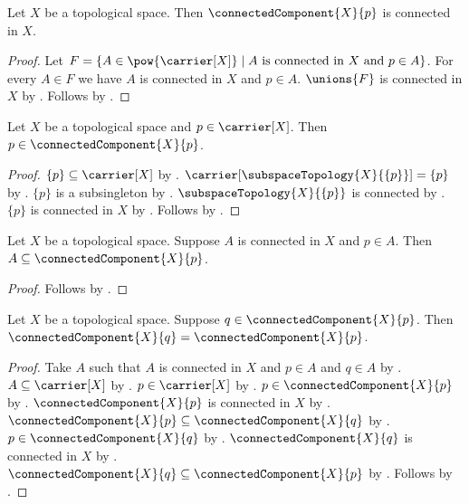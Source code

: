 \begin{theorem}\label{connected_component_is_connected}
    Let $X$ be a topological space.
    Then $\connectedComponent{X}{p}$ is connected in $X$.
\end{theorem}
\begin{proof}
    Let $F=\{A\in\pow{\carrier[X]}\mid\text{$A$ is connected in $X$ and $p\in A$}\}$.
    For every $A\in F$ we have $A$ is connected in $X$ and $p\in A$.
    $\unions{F}$ is connected in $X$ by .
    Follows by .
\end{proof}

\begin{theorem}\label{point_in_connected_component}
    Let $X$ be a topological space and $p\in\carrier[X]$.
    Then $p\in\connectedComponent{X}{p}$.
\end{theorem}
\begin{proof}
    $\{p\}\subseteq\carrier[X]$ by .
    $\carrier[\subspaceTopology{X}{\{p\}}]=\{p\}$ by .
    $\{p\}$ is a subsingleton by .
    $\subspaceTopology{X}{\{p\}}$ is connected by
        .
    $\{p\}$ is connected in $X$ by .
    Follows by .
\end{proof}

\begin{theorem}\label{connected_component_contains_connected_subset}
    Let $X$ be a topological space.
    Suppose $A$ is connected in $X$ and $p\in A$.
    Then $A\subseteq\connectedComponent{X}{p}$.
\end{theorem}
\begin{proof}
    Follows by .
\end{proof}

\begin{theorem}\label{connected_component_eq_at_member}
    Let $X$ be a topological space.
    Suppose $q\in\connectedComponent{X}{p}$.
    Then $\connectedComponent{X}{q}=\connectedComponent{X}{p}$.
\end{theorem}
\begin{proof}
    Take $A$ such that $A$ is connected in $X$ and $p\in A$ and $q\in A$ by
        .
    $A\subseteq\carrier[X]$ by .
    $p\in\carrier[X]$ by .
    $p\in\connectedComponent{X}{p}$ by .
    $\connectedComponent{X}{p}$ is connected in $X$ by .
    $\connectedComponent{X}{p}\subseteq\connectedComponent{X}{q}$ by
        .
    $p\in\connectedComponent{X}{q}$ by .
    $\connectedComponent{X}{q}$ is connected in $X$ by .
    $\connectedComponent{X}{q}\subseteq\connectedComponent{X}{p}$ by
        .
    Follows by .
\end{proof}


